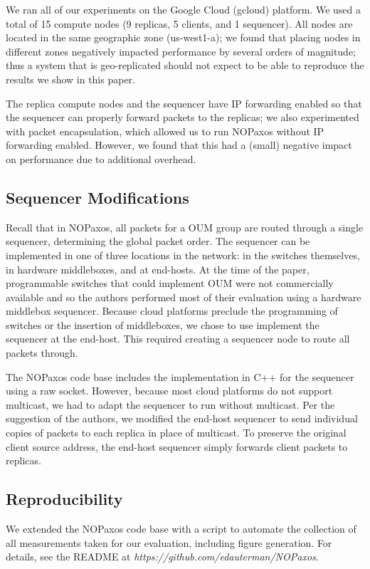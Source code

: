 We ran all of our experiments on the Google Cloud (gcloud) platform. We used a total of 15 compute nodes (9 replicas, 5 clients, and 1 sequencer). All nodes are located in the same geographic zone (us-west1-a); we found that placing nodes in different zones negatively impacted performance by several orders of magnitude; thus a system that is geo-replicated should not expect to be able to reproduce the results we show in this paper. 

The replica compute nodes and the sequencer have IP forwarding enabled so that the sequencer can properly forward packets to the replicas; we also experimented with packet encapsulation, which allowed us to run NOPaxos without IP forwarding enabled. However, we found that this had a (small) negative impact on performance due to additional overhead.

\subsection{Sequencer Modifications}

Recall that in NOPaxos, all packets for a OUM group are routed through a single sequencer, determining the global packet order. The sequencer can be implemented in one of three locations in the network: in the switches themselves, in hardware middleboxes, and at end-hosts. At the time of the paper, programmable switches that could implement OUM were not commercially available and so the authors performed most of their evaluation using a hardware middlebox sequencer. Because cloud platforms preclude the programming of switches or the insertion of middleboxes, we chose to use implement the sequencer at the end-host. This required creating a sequencer node to route all packets through. 

The NOPaxos code base includes the implementation in C++ for the sequencer using a raw socket. However, because most cloud platforms do not support multicast, we had to adapt the sequencer to run without multicast. Per the suggestion of the authors, we modified the end-host sequencer to send individual copies of packets to each replica in place of multicast. To preserve the original client source address, the end-host sequencer simply forwards client packets to replicas.

\subsection{Reproducibility}

We extended the NOPaxos code base with a script to automate the collection of all measurements taken for our evaluation, including figure generation. For details, see the README at \textit{https://github.com/edauterman/NOPaxos}.  
